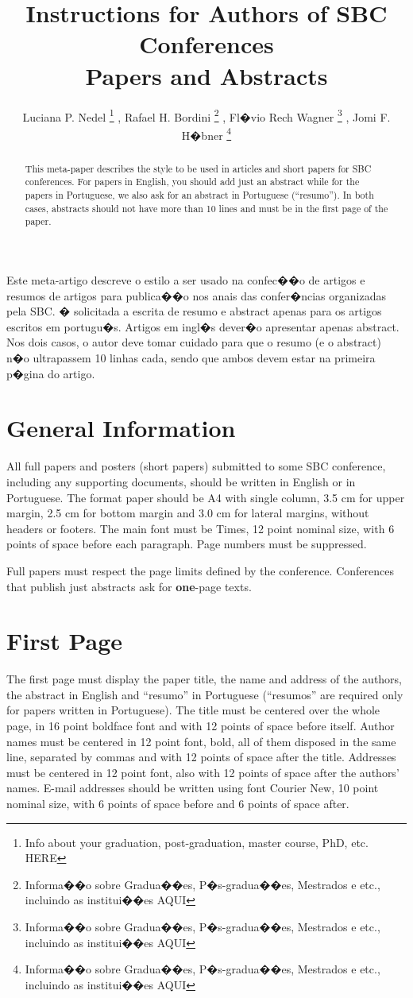\documentclass[12pt]{article}
\title{Instructions for Authors of SBC Conferences\\ Papers and Abstracts}
\author{
	Luciana P. Nedel
		\thanks{Info about your graduation, post-graduation, master course, PhD, etc. HERE} \inst{1}
	, Rafael H. Bordini 
		\thanks{Informa��o sobre Gradua��es, P�s-gradua��es, Mestrados e etc., incluindo as institui��es AQUI} \inst{2}
	, Fl�vio Rech Wagner 
		\thanks{Informa��o sobre Gradua��es, P�s-gradua��es, Mestrados e etc., incluindo as institui��es AQUI} \inst{1}
	, Jomi F. H�bner 
		\thanks{Informa��o sobre Gradua��es, P�s-gradua��es, Mestrados e etc., incluindo as institui��es AQUI} \inst{3} 
}
\begin{document}
\maketitle

\begin{abstract}
  This meta-paper describes the style to be used in articles and short papers
  for SBC conferences. For papers in English, you should add just an abstract
  while for the papers in Portuguese, we also ask for an abstract in
  Portuguese (``resumo''). In both cases, abstracts should not have more than
  10 lines and must be in the first page of the paper.
\end{abstract}

\begin{resumo}
  Este meta-artigo descreve o estilo a ser usado na confec��o de artigos e
  resumos de artigos para publica��o nos anais das confer�ncias organizadas
  pela SBC. � solicitada a escrita de resumo e abstract apenas para os artigos
  escritos em portugu�s. Artigos em ingl�s dever�o apresentar apenas abstract.
  Nos dois casos, o autor deve tomar cuidado para que o resumo (e o abstract)
  n�o ultrapassem 10 linhas cada, sendo que ambos devem estar na primeira
  p�gina do artigo.
\end{resumo}


\section{General Information}

All full papers and posters (short papers) submitted to some SBC conference,
including any supporting documents, should be written in English or in
Portuguese. The format paper should be A4 with single column, 3.5 cm for upper
margin, 2.5 cm for bottom margin and 3.0 cm for lateral margins, without
headers or footers. The main font must be Times, 12 point nominal size, with 6
points of space before each paragraph. Page numbers must be suppressed.

Full papers must respect the page limits defined by the conference.
Conferences that publish just abstracts ask for \textbf{one}-page texts.

\section{First Page} \label{sec:firstpage}

The first page must display the paper title, the name and address of the
authors, the abstract in English and ``resumo'' in Portuguese (``resumos'' are
required only for papers written in Portuguese). The title must be centered
over the whole page, in 16 point boldface font and with 12 points of space
before itself. Author names must be centered in 12 point font, bold, all of
them disposed in the same line, separated by commas and with 12 points of
space after the title. Addresses must be centered in 12 point font, also with
12 points of space after the authors' names. E-mail addresses should be
written using font Courier New, 10 point nominal size, with 6 points of space
before and 6 points of space after.
\end{document}
